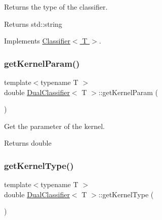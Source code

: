 Returns the type of the classifier. 

\begin{DoxyReturn}{Returns}
std\+::string 
\end{DoxyReturn}


Implements \hyperlink{class_classifier_ab40f42f957ec50939bd9a6b0cd5d1786}{Classifier$<$ T $>$}.

\mbox{\label{class_dual_classifier_ad5cc383587a3388bfc370879d76b8cf6}} 
\subsubsection{\texorpdfstring{get\+Kernel\+Param()}{getKernelParam()}}
{\footnotesize\ttfamily template$<$typename T $>$ \\
double \hyperlink{class_dual_classifier}{Dual\+Classifier}$<$ T $>$\+::get\+Kernel\+Param (\begin{DoxyParamCaption}{ }\end{DoxyParamCaption})\hspace{0.3cm}{\ttfamily [inline]}}



Get the parameter of the kernel. 

\begin{DoxyReturn}{Returns}
double 
\end{DoxyReturn}
\mbox{\label{class_dual_classifier_ae15bdcaa9b46e1084aa2df7170a0217f}} 
\subsubsection{\texorpdfstring{get\+Kernel\+Type()}{getKernelType()}}
{\footnotesize\ttfamily template$<$typename T $>$ \\
double \hyperlink{class_dual_classifier}{Dual\+Classifier}$<$ T $>$\+::get\+Kernel\+Type (\begin{DoxyParamCaption}{ }\end{DoxyParamCaption})\hspace{0.3cm}{\ttfamily [inline]}}



